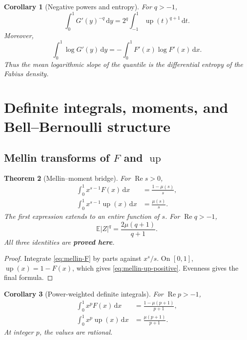 \documentclass[11pt]{article}
\newcommand{\statusproved}{\textcolor{statusgreen}{\textbf{proved here}}}
\newtheorem{theorem}{Theorem}[section]
\newtheorem{corollary}[theorem]{Corollary}
\theoremstyle{definition}
\theoremstyle{remark}
\newcommand{\E}{\mathbb E}
\newcommand{\dd}{\,\mathrm d}
\newcommand{\Up}{\operatorname{up}}
\newcommand{\Ree}{\operatorname{Re}}
\begin{document}
\begin{corollary}[Negative powers and entropy]
For $q>-1$,
\begin{equation}
 \int_0^1G'(y)^{-q}\dd y
 =2^q\int_{-1}^{1}\Up(t)^{q+1}\dd t.
 \label{eq:inverse-negative-slope}
\end{equation}
Moreover,
\begin{equation}
 \int_0^1\log G'(y)\dd y
 =-\int_0^1F'(x)\log F'(x)\dd x.
 \label{eq:inverse-entropy}
\end{equation}
Thus the mean logarithmic slope of the quantile is the differential entropy of the Fabius
density.
\end{corollary}

\section{Definite integrals, moments, and Bell--Bernoulli structure}
\label{sec:definite}

\subsection{Mellin transforms of $F$ and $\Up$}

\begin{theorem}[Mellin--moment bridge]
\label{thm:mellin-F}
For $\Ree s>0$,
\begin{align}
 \int_0^1x^{s-1}F(x)\dd x
 &=\frac{1-\mu(s)}s,\label{eq:mellin-F}\\
 \int_0^1x^{s-1}\Up(x)\dd x
 &=\frac{\mu(s)}s.\label{eq:mellin-up-positive}
\end{align}
The first expression extends to an entire function of $s$.  For $\Ree q>-1$,
\begin{equation}
 \E|Z|^q=\frac{2\mu(q+1)}{q+1}.
 \label{eq:absolute-Z-moment}
\end{equation}
All three identities are \statusproved.
\end{theorem}

\begin{proof}
Integrate \cref{eq:mellin-F} by parts against $x^s/s$.  On $[0,1]$,
$\Up(x)=1-F(x)$, which gives \cref{eq:mellin-up-positive}.  Evenness gives the final formula.
\end{proof}

\begin{corollary}[Power-weighted definite integrals]
For $\Ree p>-1$,
\begin{align}
 \int_0^1x^pF(x)\dd x
 &=\frac{1-\mu(p+1)}{p+1},\label{eq:F-power-definite}\\
 \int_0^1x^p\Up(x)\dd x
 &=\frac{\mu(p+1)}{p+1}.\label{eq:up-power-definite}
\end{align}
At integer $p$, the values are rational.
\end{corollary}
\end{document}

